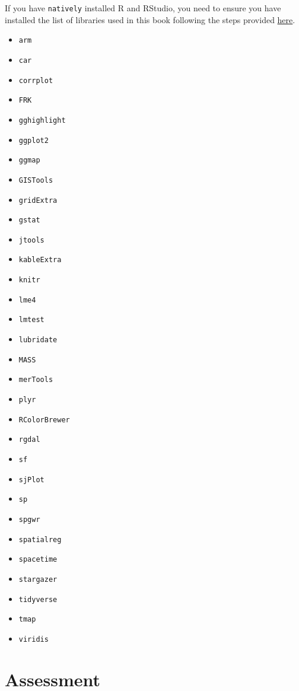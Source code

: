 \documentclass[
  letterpaper,
  krantz2]{style/krantz}
\providecommand{\tightlist}{%
  \setlength{\itemsep}{0pt}\setlength{\parskip}{0pt}}\usepackage{longtable,booktabs,array}
\begin{document}
If you have \texttt{natively} installed R and RStudio, you need to
ensure you have installed the list of libraries used in this book
following the steps provided
\href{https://gdsl-ul.github.io/r_install/otherWin.html\#install-packages}{here}.

\begin{itemize}
\tightlist
\item
  \texttt{arm}
\item
  \texttt{car}
\item
  \texttt{corrplot}
\item
  \texttt{FRK}
\item
  \texttt{gghighlight}
\item
  \texttt{ggplot2}
\item
  \texttt{ggmap}
\item
  \texttt{GISTools}
\item
  \texttt{gridExtra}
\item
  \texttt{gstat}
\item
  \texttt{jtools}
\item
  \texttt{kableExtra}
\item
  \texttt{knitr}
\item
  \texttt{lme4}
\item
  \texttt{lmtest}
\item
  \texttt{lubridate}
\item
  \texttt{MASS}
\item
  \texttt{merTools}
\item
  \texttt{plyr}
\item
  \texttt{RColorBrewer}
\item
  \texttt{rgdal}
\item
  \texttt{sf}
\item
  \texttt{sjPlot}
\item
  \texttt{sp}
\item
  \texttt{spgwr}
\item
  \texttt{spatialreg}
\item
  \texttt{spacetime}
\item
  \texttt{stargazer}
\item
  \texttt{tidyverse}
\item
  \texttt{tmap}
\item
  \texttt{viridis}
\end{itemize}

\hypertarget{assessment}{%
\section{Assessment}\label{assessment}}
\end{document}
